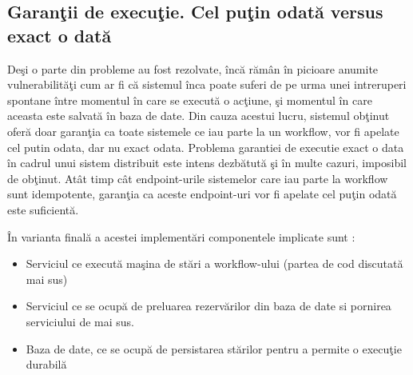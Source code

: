 \documentclass[a4paper,12pt]{report}
\begin{document}
\subsection{Garanţii de execuţie. Cel puţin odată versus exact o dată}
\par Deşi o parte din probleme au fost rezolvate, încă rămân în picioare anumite vulnerabilităţi cum ar fi că sistemul înca poate suferi de pe urma unei intreruperi spontane între momentul în care se execută o acţiune, şi momentul în care aceasta este salvată în baza de date. Din cauza acestui lucru, sistemul obţinut oferă doar garanţia ca toate sistemele ce iau parte la un workflow, vor fi apelate cel putin odata, dar nu exact odata. Problema garantiei de executie exact o data în cadrul unui sistem distribuit este intens dezbătută şi în multe cazuri, imposibil de obţinut. Atât timp cât endpoint-urile sistemelor care iau parte la workflow sunt idempotente, garanţia ca aceste endpoint-uri vor fi apelate cel puţin odată este suficientă.
\par În varianta finală a acestei implementări componentele implicate sunt : 
\begin{itemize}
\item Serviciul ce execută maşina de stări a workflow-ului (partea de cod discutată mai sus)
\item Serviciul ce se ocupă de preluarea rezervărilor din baza de date si pornirea serviciului de mai sus.
\item Baza de date, ce se ocupă de persistarea stărilor pentru a permite o execuţie durabilă
\end{itemize}
\end{document}
